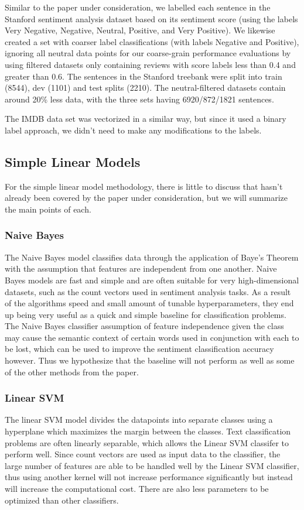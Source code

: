 \documentclass[conference]{IEEEtran}
\begin{document}
Similar to the paper under consideration, we labelled each sentence in the Stanford sentiment analysis dataset based on its sentiment score (using the labels Very Negative, Negative, Neutral, Positive, and Very Positive). We likewise created a set with coarser label classifications (with labels Negative and Positive), ignoring all neutral data points for our coarse-grain performance evaluations by using filtered datasets only containing reviews with score labels less than 0.4 and greater than 0.6. The sentences in the Stanford treebank were split into train (8544), dev (1101) and test splits (2210). The neutral-filtered datasets contain around 20\% less data, with the three sets having 6920/872/1821 sentences.


The IMDB data set was vectorized in a similar way, but since it used a binary label approach, we didn't need to make any modifications to the labels.

\subsection{Simple Linear Models}

For the simple linear model methodology, there is little to discuss that hasn't already been covered by the paper under consideration, but we will summarize the main points of each. 

\subsubsection{Naive Bayes}
The Naive Bayes model classifies data through the application of Baye's Theorem with the assumption that features are independent from one another. Naive Bayes models are fast and simple and are often suitable for very high-dimensional datasets, such as the count vectors used in sentiment analysis tasks. As a result of the algorithms speed and small amount of tunable hyperparameters, they end up being very useful as a quick and simple baseline for classification problems. The Naive Bayes classifier assumption of feature independence given the class may cause the semantic context of certain words used in conjunction with each to be lost, which can be used to improve the sentiment classification accuracy however. Thus we hypothesize that the baseline will not perform as well as some of the other methods from the paper.

\subsubsection{Linear SVM}
The linear SVM model divides the datapoints into separate classes using a hyperplane which maximizes the margin between the classes. Text classification problems are often linearly separable, which allows the Linear SVM classifer to perform well. Since count vectors are used as input data to the classifier, the large number of features are able to be handled well by the Linear SVM classifier, thus using another kernel will not increase performance significantly but instead will increase the computational cost. There are also less parameters to be optimized than other classifiers.
\end{document}
